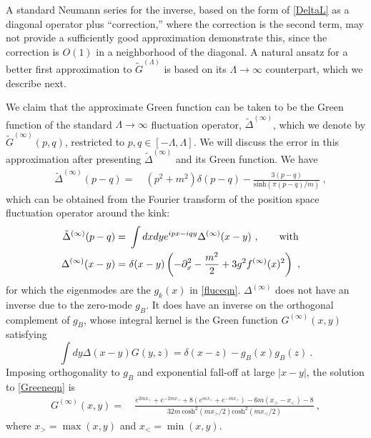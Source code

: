 \def\letter{0}\def\pr{0}\documentclass[a4paper,12pt, epsfig]{article}
\renewcommand{\sinh}{\textrm{sinh}}
\renewcommand{\cosh}{\textrm{cosh}}
\renewcommand{\(}{\begin{equation}}
\renewcommand{\)}{end{equation} \vspace{-.05in}\linebreak}
\renewcommand{\=}{\hspace{-.03in}=\hspace{-.02in}}
\renewcommand{\(}{\begin{equation}}
\renewcommand{\)}{\end{equation}}
\renewcommand{\(}{\begin{equation}}
\renewcommand{\)}{\end{equation}}
\begin{document}
A standard Neumann series for the inverse, based on the form of \eqref{DeltaL} as a diagonal operator plus ``correction,'' where the correction is the second term, may not provide a sufficiently good approximation demonstrate this, since the correction is $O(1)$ in a neighborhood of the diagonal.  A natural ansatz for a better first approximation to $\tilde{G}^{(\Lambda)}$ is based on its $\Lambda \to \infty$ counterpart, which we describe next.

We claim that the approximate Green function can be taken to be the Green function of the standard $\Lambda \to \infty$ fluctuation operator, $\tilde{\Delta}^{(\infty)}$, which we denote by $\tilde{G}^{(\infty)}(p,q)$, restricted to $p,q \in [-\Lambda,\Lambda]$.  We will discuss the error in this approximation after presenting $\tilde{\Delta}^{(\infty)}$ and its Green function.  We have
%
\begin{align}\label{tildedeltainf}
\quad \tilde{\Delta}^{(\infty)}(p-q) =&~  (p^2 + m^2) \delta(p-q) - \frac{3(p-q)}{\sinh(\pi (p-q)/m)} ~ ,
\end{align}
%
which can be obtained from the Fourier transform of the position space fluctuation operator around the kink:
%
\begin{align}
\tilde{\Delta}^{(\infty)}(p-q) =&~ \int dx dy e^{i p x - i q y} \Delta^{(\infty)}(x-y)~, \qquad \textrm{with} \cr
\Delta^{(\infty)}(x-y) =&~ \delta(x-y) \left( - \partial_{x}^2 - \frac{m^2}{2} + 3 g^2 f^{(\infty)}(x)^2 \right)~,
\end{align}
% 
for which the eigenmodes are the $g_k(x)$ in \eqref{fluceqn}.  $\Delta^{(\infty)}$ does not have an inverse due to the zero-mode $g_B$.  It does have an inverse on the orthogonal complement of $g_B$, whose integral kernel is the Green function $G^{(\infty)}(x,y)$ satisfying
%
\begin{equation}\label{Greeneqn}
\int dy \Delta(x-y) G(y,z) = \delta(x-z) - g_B(x) g_B(z)~.
\end{equation}
%
Imposing orthogonality to $g_B$ and exponential fall-off at large $|x-y|$, the solution to \eqref{Greeneqn} is
%
\begin{align}\label{positionGreen}
G^{(\infty)}(x,y) =&~ \frac{e^{2m x_<} + e^{-2 m x_>} + 8 (e^{m x_<} + e^{-m x_>}) - 6 m (x_> - x_<) - 8}{32 m~\cosh^2(m x_>/2) \cosh^2(m x_</2)} ~,
\end{align}
%
where $x_{>} = \max(x,y)$ and $x_{<} = \min(x,y)$.  
\end{document}
